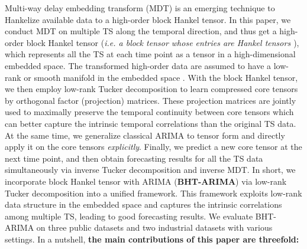 \documentclass[letterpaper]{article} %
\numberwithin{theorem}{section}
\begin{document}
	Multi-way delay embedding transform (MDT)  \cite{yokota2018missing}  is an emerging technique to Hankelize  available data to a high-order block Hankel tensor. In this paper, we conduct MDT on multiple  TS along the temporal direction, and thus get a  high-order block Hankel tensor   (\textit{i.e. a block tensor whose entries are Hankel  tensors \cite{ding2015fast}}),  which represents all the  TS at each time point    as a tensor  in a high-dimensional embedded space. The transformed  high-order data are assumed to have   a low-rank  or  smooth manifold  in the embedded space \cite{yokota2018missing,yokota2018tensor}.
	With the block Hankel tensor, we then employ low-rank Tucker decomposition  to  learn  compressed core tensors by    orthogonal factor (projection) matrices.  These  projection matrices  are jointly used  to maximally preserve the temporal continuity between core tensors which can better capture the intrinsic  temporal correlations than the original TS data.
	At the same time,  we generalize classical ARIMA to tensor form and directly apply it on the core tensors \textit{explicitly}.  Finally, we predict a new core tensor at the next time point, and then obtain forecasting results for all the TS data simultaneously via inverse Tucker decomposition and  inverse MDT.  In short, we  incorporate block Hankel tensor  with ARIMA (\textbf{BHT-ARIMA}) via low-rank Tucker decomposition into  a unified framework.    This framework  exploits  low-rank data structure in the embedded space and captures the intrinsic correlations among multiple TS, leading to  good forecasting results.
	We evaluate  BHT-ARIMA on  three public  datasets and two industrial datasets with  various settings.
	In a nutshell,  \textbf{the main  contributions of this paper are threefold:}
\end{document}
